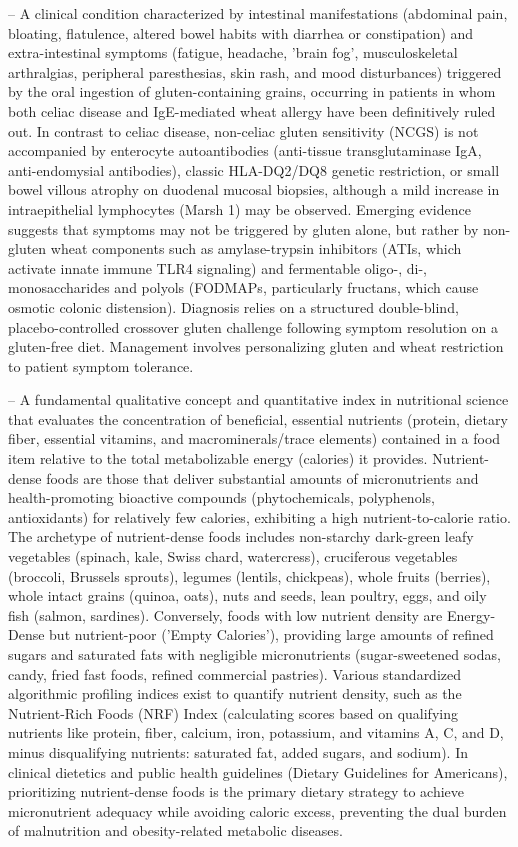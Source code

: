 -- A clinical condition characterized by intestinal manifestations (abdominal pain, bloating, flatulence, altered bowel habits with diarrhea or constipation) and extra-intestinal symptoms (fatigue, headache, 'brain fog', musculoskeletal arthralgias, peripheral paresthesias, skin rash, and mood disturbances) triggered by the oral ingestion of gluten-containing grains, occurring in patients in whom both celiac disease and IgE-mediated wheat allergy have been definitively ruled out. In contrast to celiac disease, non-celiac gluten sensitivity (NCGS) is not accompanied by enterocyte autoantibodies (anti-tissue transglutaminase IgA, anti-endomysial antibodies), classic HLA-DQ2/DQ8 genetic restriction, or small bowel villous atrophy on duodenal mucosal biopsies, although a mild increase in intraepithelial lymphocytes (Marsh 1) may be observed. Emerging evidence suggests that symptoms may not be triggered by gluten alone, but rather by non-gluten wheat components such as amylase-trypsin inhibitors (ATIs, which activate innate immune TLR4 signaling) and fermentable oligo-, di-, monosaccharides and polyols (FODMAPs, particularly fructans, which cause osmotic colonic distension). Diagnosis relies on a structured double-blind, placebo-controlled crossover gluten challenge following symptom resolution on a gluten-free diet. Management involves personalizing gluten and wheat restriction to patient symptom tolerance.

-- A fundamental qualitative concept and quantitative index in nutritional science that evaluates the concentration of beneficial, essential nutrients (protein, dietary fiber, essential vitamins, and macrominerals/trace elements) contained in a food item relative to the total metabolizable energy (calories) it provides. Nutrient-dense foods are those that deliver substantial amounts of micronutrients and health-promoting bioactive compounds (phytochemicals, polyphenols, antioxidants) for relatively few calories, exhibiting a high nutrient-to-calorie ratio. The archetype of nutrient-dense foods includes non-starchy dark-green leafy vegetables (spinach, kale, Swiss chard, watercress), cruciferous vegetables (broccoli, Brussels sprouts), legumes (lentils, chickpeas), whole fruits (berries), whole intact grains (quinoa, oats), nuts and seeds, lean poultry, eggs, and oily fish (salmon, sardines). Conversely, foods with low nutrient density are Energy-Dense but nutrient-poor ('Empty Calories'), providing large amounts of refined sugars and saturated fats with negligible micronutrients (sugar-sweetened sodas, candy, fried fast foods, refined commercial pastries). Various standardized algorithmic profiling indices exist to quantify nutrient density, such as the Nutrient-Rich Foods (NRF) Index (calculating scores based on qualifying nutrients like protein, fiber, calcium, iron, potassium, and vitamins A, C, and D, minus disqualifying nutrients: saturated fat, added sugars, and sodium). In clinical dietetics and public health guidelines (Dietary Guidelines for Americans), prioritizing nutrient-dense foods is the primary dietary strategy to achieve micronutrient adequacy while avoiding caloric excess, preventing the dual burden of malnutrition and obesity-related metabolic diseases.

